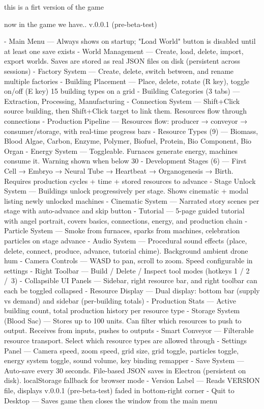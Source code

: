 this is a firt version of the game

now in the game we have..
 v.0.0.1 (pre-beta-test)

  - Main Menu — Always shows on startup; "Load World" button is disabled until at least one save exists
  - World Management — Create, load, delete, import, export worlds. Saves are stored as real JSON files on disk
  (persistent across sessions)
  - Factory System — Create, delete, switch between, and rename multiple factories
  - Building Placement — Place, delete, rotate (R key), toggle on/off (E key) 15 building types on a grid
  - Building Categories (3 tabs) — Extraction, Processing, Manufacturing
  - Connection System — Shift+Click source building, then Shift+Click target to link them. Resources flow through
   connections
  - Production Pipeline — Resources flow: producer → conveyor → consumer/storage, with real-time progress bars
  - Resource Types (9) — Biomass, Blood Algae, Carbon, Enzyme, Polymer, Biofuel, Protein, Bio Component, Bio
  Organ
  - Energy System — Toggleable. Furnaces generate energy, machines consume it. Warning shown when below 30%
  - Development Stages (6) — First Cell → Embryo → Neural Tube → Heartbeat → Organogenesis → Birth. Requires
  production cycles + time + stored resources to advance
  - Stage Unlock System — Buildings unlock progressively per stage. Shows cinematic + modal listing newly
  unlocked machines
  - Cinematic System — Narrated story scenes per stage with auto-advance and skip button
  - Tutorial — 5-page guided tutorial with angel portrait, covers basics, connections, energy, and production
  chain
  - Particle System — Smoke from furnaces, sparks from machines, celebration particles on stage advance
  - Audio System — Procedural sound effects (place, delete, connect, produce, advance, tutorial chime).
  Background ambient drone hum
  - Camera Controls — WASD to pan, scroll to zoom. Speed configurable in settings
  - Right Toolbar — Build / Delete / Inspect tool modes (hotkeys 1 / 2 / 3)
  - Collapsible UI Panels — Sidebar, right resource bar, and right toolbar can each be toggled collapsed
  - Resource Display — Dual display: bottom bar (supply vs demand) and sidebar (per-building totals)
  - Production Stats — Active building count, total production history per resource type
  - Storage System (Blood Sac) — Stores up to 100 units. Can filter which resources to push to output. Receives
  from inputs, pushes to outputs
  - Smart Conveyor — Filterable resource transport. Select which resource types are allowed through
  - Settings Panel — Camera speed, zoom speed, grid size, grid toggle, particles toggle, energy system toggle,
  sound volume, key binding remapper
  - Save System — Auto-save every 30 seconds. File-based JSON saves in Electron (persistent on disk).
  localStorage fallback for browser mode
  - Version Label — Reads VERSION file, displays v.0.0.1 (pre-beta-test) faded in bottom-right corner
  - Quit to Desktop — Saves game then closes the window from the main menu
